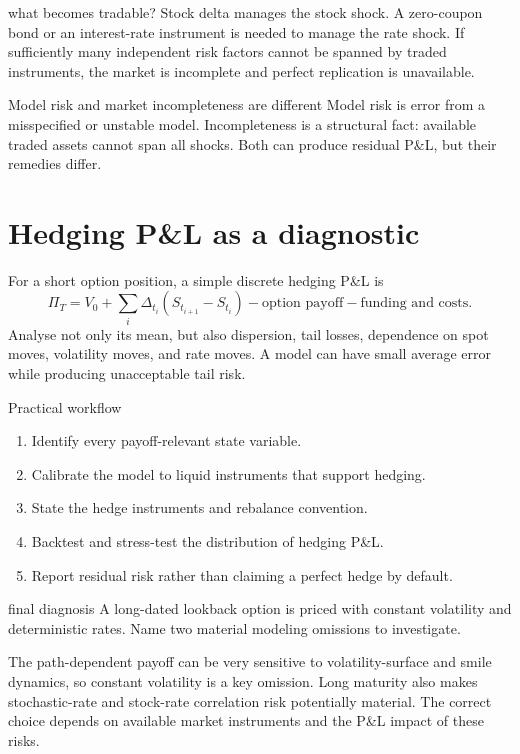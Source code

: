 \documentclass[10pt]{article}
\theoremstyle{definition}\newtheorem{definition}{Definition}[section]
\begin{document}
\begin{boardexample}{what becomes tradable?}
Stock delta manages the stock shock. A zero-coupon bond or an interest-rate
instrument is needed to manage the rate shock. If sufficiently many
independent risk factors cannot be spanned by traded instruments, the
market is incomplete and perfect replication is unavailable.
\end{boardexample}

\begin{warningbox}{Model risk and market incompleteness are different}
Model risk is error from a misspecified or unstable model. Incompleteness is
a structural fact: available traded assets cannot span all shocks. Both can
produce residual P\&L, but their remedies differ.
\end{warningbox}

\section{Hedging P\&L as a diagnostic}
For a short option position, a simple discrete hedging P\&L is
\[
\Pi_T=V_0+\sum_i\Delta_{t_i}(S_{t_{i+1}}-S_{t_i})
-\text{option payoff}-\text{funding and costs}.
\]
Analyse not only its mean, but also dispersion, tail losses, dependence on
spot moves, volatility moves, and rate moves. A model can have small average
error while producing unacceptable tail risk.

\begin{keyidea}{Practical workflow}
\begin{enumerate}
\item Identify every payoff-relevant state variable.
\item Calibrate the model to liquid instruments that support hedging.
\item State the hedge instruments and rebalance convention.
\item Backtest and stress-test the distribution of hedging P\&L.
\item Report residual risk rather than claiming a perfect hedge by default.
\end{enumerate}
\end{keyidea}

\begin{studentexercise}{final diagnosis}
A long-dated lookback option is priced with constant volatility and
deterministic rates. Name two material modeling omissions to investigate.
\end{studentexercise}
\begin{shortsolution}
The path-dependent payoff can be very sensitive to volatility-surface and
smile dynamics, so constant volatility is a key omission. Long maturity also
makes stochastic-rate and stock-rate correlation risk potentially material.
The correct choice depends on available market instruments and the P\&L
impact of these risks.
\end{shortsolution}
\end{document}
